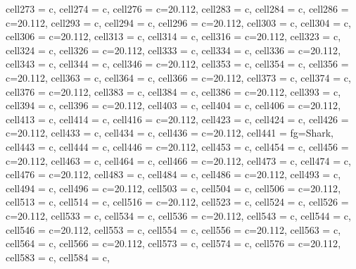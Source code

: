 \documentclass{article}
\begin{document}
{\begin{longtblr}[
  caption = {Survey responses for confirmed time series (6 responses), wastewater (5 responses), deaths (XX responses), and transmission pairs (XX responses).},
  label = {tab:placeholder_label},
]
{  cell{27}{3} = {c},
  cell{27}{4} = {c},
  cell{27}{6} = {c=2}{0.112\linewidth},
  cell{28}{3} = {c},
  cell{28}{4} = {c},
  cell{28}{6} = {c=2}{0.112\linewidth},
  cell{29}{3} = {c},
  cell{29}{4} = {c},
  cell{29}{6} = {c=2}{0.112\linewidth},
  cell{30}{3} = {c},
  cell{30}{4} = {c},
  cell{30}{6} = {c=2}{0.112\linewidth},
  cell{31}{3} = {c},
  cell{31}{4} = {c},
  cell{31}{6} = {c=2}{0.112\linewidth},
  cell{32}{3} = {c},
  cell{32}{4} = {c},
  cell{32}{6} = {c=2}{0.112\linewidth},
  cell{33}{3} = {c},
  cell{33}{4} = {c},
  cell{33}{6} = {c=2}{0.112\linewidth},
  cell{34}{3} = {c},
  cell{34}{4} = {c},
  cell{34}{6} = {c=2}{0.112\linewidth},
  cell{35}{3} = {c},
  cell{35}{4} = {c},
  cell{35}{6} = {c=2}{0.112\linewidth},
  cell{36}{3} = {c},
  cell{36}{4} = {c},
  cell{36}{6} = {c=2}{0.112\linewidth},
  cell{37}{3} = {c},
  cell{37}{4} = {c},
  cell{37}{6} = {c=2}{0.112\linewidth},
  cell{38}{3} = {c},
  cell{38}{4} = {c},
  cell{38}{6} = {c=2}{0.112\linewidth},
  cell{39}{3} = {c},
  cell{39}{4} = {c},
  cell{39}{6} = {c=2}{0.112\linewidth},
  cell{40}{3} = {c},
  cell{40}{4} = {c},
  cell{40}{6} = {c=2}{0.112\linewidth},
  cell{41}{3} = {c},
  cell{41}{4} = {c},
  cell{41}{6} = {c=2}{0.112\linewidth},
  cell{42}{3} = {c},
  cell{42}{4} = {c},
  cell{42}{6} = {c=2}{0.112\linewidth},
  cell{43}{3} = {c},
  cell{43}{4} = {c},
  cell{43}{6} = {c=2}{0.112\linewidth},
  cell{44}{1} = {fg=Shark},
  cell{44}{3} = {c},
  cell{44}{4} = {c},
  cell{44}{6} = {c=2}{0.112\linewidth},
  cell{45}{3} = {c},
  cell{45}{4} = {c},
  cell{45}{6} = {c=2}{0.112\linewidth},
  cell{46}{3} = {c},
  cell{46}{4} = {c},
  cell{46}{6} = {c=2}{0.112\linewidth},
  cell{47}{3} = {c},
  cell{47}{4} = {c},
  cell{47}{6} = {c=2}{0.112\linewidth},
  cell{48}{3} = {c},
  cell{48}{4} = {c},
  cell{48}{6} = {c=2}{0.112\linewidth},
  cell{49}{3} = {c},
  cell{49}{4} = {c},
  cell{49}{6} = {c=2}{0.112\linewidth},
  cell{50}{3} = {c},
  cell{50}{4} = {c},
  cell{50}{6} = {c=2}{0.112\linewidth},
  cell{51}{3} = {c},
  cell{51}{4} = {c},
  cell{51}{6} = {c=2}{0.112\linewidth},
  cell{52}{3} = {c},
  cell{52}{4} = {c},
  cell{52}{6} = {c=2}{0.112\linewidth},
  cell{53}{3} = {c},
  cell{53}{4} = {c},
  cell{53}{6} = {c=2}{0.112\linewidth},
  cell{54}{3} = {c},
  cell{54}{4} = {c},
  cell{54}{6} = {c=2}{0.112\linewidth},
  cell{55}{3} = {c},
  cell{55}{4} = {c},
  cell{55}{6} = {c=2}{0.112\linewidth},
  cell{56}{3} = {c},
  cell{56}{4} = {c},
  cell{56}{6} = {c=2}{0.112\linewidth},
  cell{57}{3} = {c},
  cell{57}{4} = {c},
  cell{57}{6} = {c=2}{0.112\linewidth},
  cell{58}{3} = {c},
  cell{58}{4} = {c},
}
\end{longtblr}}
\end{document}
